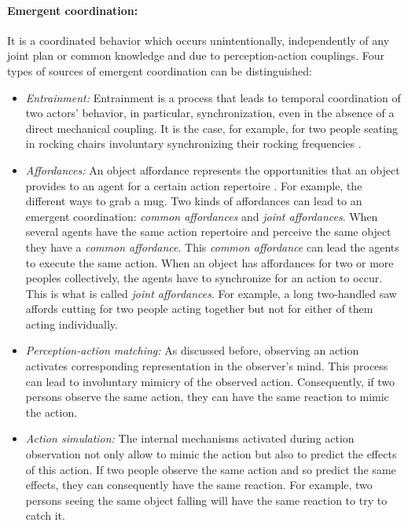\documentclass[english,a4paper,11pt,twoside]{StyleThese}
\begin{document}
\paragraph{Emergent coordination:}
It is a coordinated behavior which occurs unintentionally, independently of any joint plan or common knowledge and due to perception-action couplings. Four types of sources of emergent coordination can be distinguished:
\begin{itemize}
\item \textit{Entrainment:} Entrainment is a process that leads to temporal coordination of two actors’ behavior, in particular, synchronization, even in the absence of a direct mechanical coupling. It is the case, for example, for two people seating in rocking chairs involuntary synchronizing their rocking frequencies \cite{richardson2007rocking}.
\item \textit{Affordances:} An object affordance represents the opportunities that an object provides to an agent for a certain action repertoire \cite{gibson1977perceiving}. For example, the different ways to grab a mug. Two kinds of affordances can lead to an emergent coordination: \textit{common affordances} and \textit{joint affordances}. When several agents have the same action repertoire and perceive the same object they have a \textit{common affordance}. This \textit{common affordance} can lead the agents to execute the same action. When an object has affordances for two or more peoples collectively, the agents have to synchronize for an action to occur. This is what is called \textit{joint affordances}. For example, a long two-handled saw affords cutting for two people acting together but not for either of them acting individually.
\item \textit{Perception-action matching:} As discussed before, observing an action activates corresponding representation in the observer's mind. This process can lead to involuntary mimicry of the observed action. Consequently, if two persons observe the same action, they can have the same reaction to mimic the action.
\item \textit{Action simulation:} The internal mechanisms activated during action observation not only allow to mimic the action but also to predict the effects of this action. If two people observe the same action and so predict the same effects, they can consequently have the same reaction. For example, two persons seeing the same object falling will have the same reaction to try to catch it.
\end{itemize}
\end{document}
